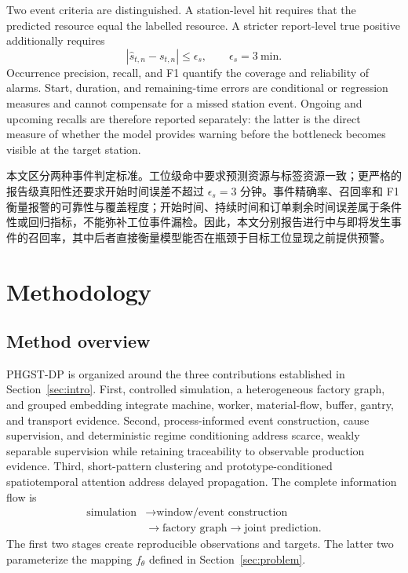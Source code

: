 \documentclass[a4paper,fleqn]{cas-dc}
\newcommand{\zhpara}[1]{%
  \par\begingroup\small\color{black!72}\noindent #1\par\endgroup}
\begin{document}
Two event criteria are distinguished. A station-level hit requires that the predicted resource equal the labelled resource. A stricter report-level true positive additionally requires
\begin{equation}
|\hat{s}_{t,n}-s_{t,n}|\leq\epsilon_s,\qquad
\epsilon_s=3~\mathrm{min}.
\end{equation}
Occurrence precision, recall, and F1 quantify the coverage and reliability of alarms. Start, duration, and remaining-time errors are conditional or regression measures and cannot compensate for a missed station event. Ongoing and upcoming recalls are therefore reported separately: the latter is the direct measure of whether the model provides warning before the bottleneck becomes visible at the target station.

\zhpara{本文区分两种事件判定标准。工位级命中要求预测资源与标签资源一致；更严格的报告级真阳性还要求开始时间误差不超过 $\epsilon_s=3$ 分钟。事件精确率、召回率和 F1 衡量报警的可靠性与覆盖程度；开始时间、持续时间和订单剩余时间误差属于条件性或回归指标，不能弥补工位事件漏检。因此，本文分别报告进行中与即将发生事件的召回率，其中后者直接衡量模型能否在瓶颈于目标工位显现之前提供预警。}
\section{Methodology} \label{sec:method}

\subsection{Method overview}

PHGST-DP is organized around the three contributions established in Section~\ref{sec:intro}. First, controlled simulation, a heterogeneous factory graph, and grouped embedding integrate machine, worker, material-flow, buffer, gantry, and transport evidence. Second, process-informed event construction, cause supervision, and deterministic regime conditioning address scarce, weakly separable supervision while retaining traceability to observable production evidence. Third, short-pattern clustering and prototype-conditioned spatiotemporal attention address delayed propagation. The complete information flow is
\begin{equation}
\begin{aligned}
\text{simulation}&\rightarrow\text{window/event construction}\\
&\rightarrow\text{factory graph}\rightarrow\text{joint prediction}.
\end{aligned}
\end{equation}
The first two stages create reproducible observations and targets. The latter two parameterize the mapping $f_\theta$ defined in Section~\ref{sec:problem}.
\end{document}
